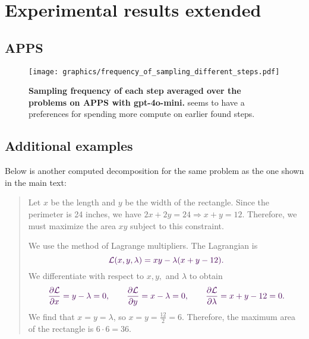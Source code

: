 \section{Experimental results extended}
\subsection{APPS}
\label{sec:apps_extended}
\begin{figure}[ht]
    \centering
    \texttt{[image: graphics/frequency\_of\_sampling\_different\_steps.pdf]}
    \caption{\textbf{Sampling frequency of each step averaged over the problems on APPS with gpt-4o-mini.} \decomp seems to have a preferences for spending more compute on earlier found steps.}
    \label{fig:sampling_frequency}
\end{figure}


\newpage
\subsection{Additional examples}
Below is another computed decomposition for the same problem as the one shown in the main text:

\begin{quote}
    \textcolor{medium}{Let \( x \) be the length and \( y \) be the width of the rectangle. Since the perimeter is 24 inches, we have \( 2x + 2y = 24 \Rightarrow x + y = 12.\)} 
    \textcolor{high}{Therefore,}
    \textcolor{low}{we must maximize the area \( xy \) subject to this constraint.}

    \textcolor{low}{We use the method of Lagrange multipliers. The Lagrangian is}
    \[
    \textcolor{low}{\mathcal{L}(x, y, \lambda) = xy - \lambda(x + y - 12).}
    \]
    \textcolor{low}{We differentiate with respect to \( x, y, \) and \( \lambda \) to obtain}
    \[
    \textcolor{low}{\frac{\partial \mathcal{L}}{\partial x} = y - \lambda = 0, \qquad \frac{\partial \mathcal{L}}{\partial y} = x - \lambda = 0, \qquad \frac{\partial \mathcal{L}}{\partial \lambda} = x + y - 12 = 0.}
    \]
    \textcolor{low}{We find that \( x = y = \lambda \), so \( x = y = \frac{12}{2} = 6. \) Therefore, the maximum area of the rectangle is \( 6 \cdot 6 = \boxed{36}.\)}
\end{quote}

\newpage
